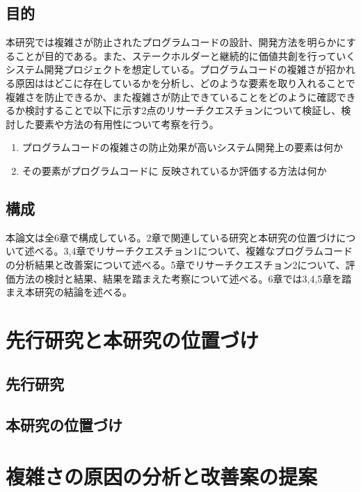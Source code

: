 \documentclass[12pt, a4paper]{jreport}
\begin{document}
\section{目的}
本研究では複雑さが防止されたプログラムコードの設計、開発方法を明らかにすることが目的である。また、ステークホルダーと継続的に価値共創を行っていくシステム開発プロジェクトを想定している。プログラムコードの複雑さが招かれる原因ははどこに存在しているかを分析し、どのような要素を取り入れることで複雑さを防止できるか、また複雑さが防止できていることをどのように確認できるか検討することで以下に示す2点のリサーチクエスチョンについて検証し、検討した要素や方法の有用性について考察を行う。
\begin{enumerate}
\item プログラムコードの複雑さの防止効果が高いシステム開発上の要素は何か
\item その要素がプログラムコードに
反映されているか評価する方法は何か
\end{enumerate}
\section{構成}
本論文は全6章で構成している。2章で関連している研究と本研究の位置づけについて述べる。3,4章でリサーチクエスチョン1について、複雑なプログラムコードの分析結果と改善案について述べる。5章でリサーチクエスチョン2について、評価方法の検討と結果、結果を踏まえた考察について述べる。6章では3,4,5章を踏まえ本研究の結論を述べる。
\chapter{先行研究と本研究の位置づけ}
\section{先行研究}
\subsection{}
\subsection{}
\section{本研究の位置づけ}
\chapter{複雑さの原因の分析と改善案の提案}
\end{document}
